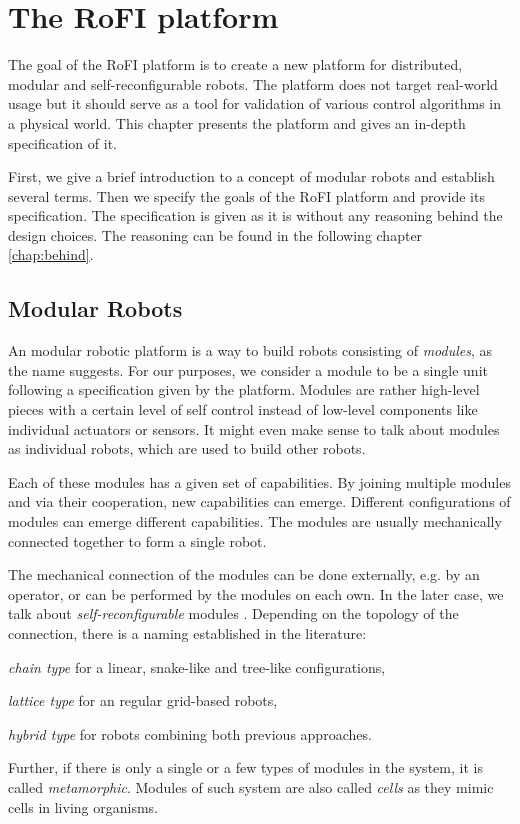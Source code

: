 \chapter{The RoFI platform}\label{chap:rofi}

The goal of the RoFI platform is to create a new platform for distributed,
modular and self-reconfigurable robots. The platform does not target real-world
usage but it should serve as a tool for validation of various control algorithms
in a physical world. This chapter presents the platform and gives an in-depth
specification of it.

First, we give a brief introduction to a concept of modular robots and establish
several terms. Then we specify the goals of the RoFI platform and provide its
specification. The specification is given as it is without any reasoning behind
the design choices. The reasoning can be found in the following chapter
\ref{chap:behind}.

\section{Modular Robots}

An modular robotic platform is a way to build robots consisting of
\emph{modules}, as the name suggests. For our purposes, we consider a module to
be a single unit following a specification given by the platform. Modules are
rather high-level pieces with a certain level of self control instead of
low-level components like individual actuators or sensors. It might even make
sense to talk about modules as individual robots, which are used to build other
robots\cite{brunete_current_2017}.

Each of these modules has a given set of capabilities. By joining multiple
modules and via their cooperation, new capabilities can emerge. Different
configurations of modules can emerge different capabilities. The modules are
usually mechanically connected together to form a single robot.

The mechanical connection of the modules can be done externally, e.g. by an
operator, or can be performed by the modules on each own. In the later case, we
talk about \emph{self-reconfigurable} modules \cite{brunete_current_2017}.
Depending on the topology of the connection, there is a naming established in
the literature\cite{brunete_current_2017}:
\begin{enumerate*}
    \item \emph{chain type} for a linear, snake-like and tree-like
    configurations,
    \item \emph{lattice type} for an regular grid-based robots,
    \item \emph{hybrid type} for robots combining both previous approaches.
\end{enumerate*}
Further, if there is only a single or a few types of modules in the system, it
is called \emph{metamorphic}\cite{brunete_current_2017}. Modules of such system
are also called \emph{cells} as they mimic cells in living organisms.

